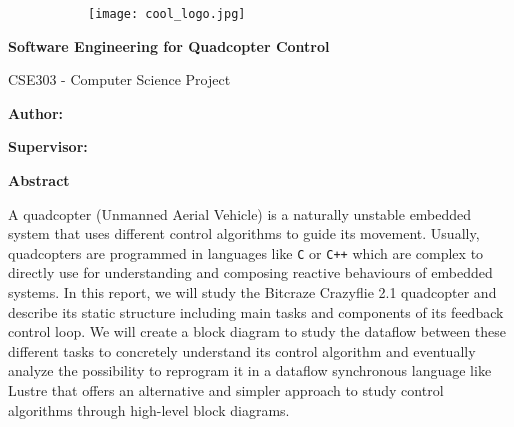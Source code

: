 \documentclass[10pt, a4paper]{article}
\newcommand{\textDef}[1]{\texttt{#1}}
\begin{document}
\setcounter{figure}{0}

\begin{figure}
    \centering
    \begin{subfigure}[b]{0.35\textwidth}
        \centering
        \texttt{[image: cool\_logo.jpg]}
        \label{Polytechnique}
    \end{subfigure}
    \label{Cool Logos}
\end{figure}

\begin{titlepage}
    \vspace*{0.5cm}
    \begin{center}
        \Large
        \textbf{Software Engineering for Quadcopter Control}
        
        \vspace{0.5cm}
        \large
        CSE303 - Computer Science Project
            
        \vspace{2.0cm}
        \textbf{Author:} 
        
        \vspace{0.5cm}
        \textbf{Supervisor:} 
           
        \vspace{2.0cm}
        \textbf{Abstract}
    \end{center}
    A quadcopter (Unmanned Aerial Vehicle) is a naturally unstable embedded system that uses different control algorithms to guide its movement. Usually, quadcopters are programmed in languages like \textDef{C} or \textDef{C++} which are complex to directly use for understanding and composing reactive behaviours of embedded systems. In this report, we will study the Bitcraze Crazyflie 2.1 quadcopter and describe its static structure including main tasks and components of its feedback control loop. We will create a block diagram to study the dataflow between these different tasks to concretely understand its control algorithm and eventually analyze the possibility to reprogram it in a dataflow synchronous language like Lustre that offers an alternative and simpler approach to study control algorithms through high-level block diagrams.
    \vspace*{\fill}
\end{titlepage}
\clearpage

\tableofcontents
\clearpage
\end{document}
